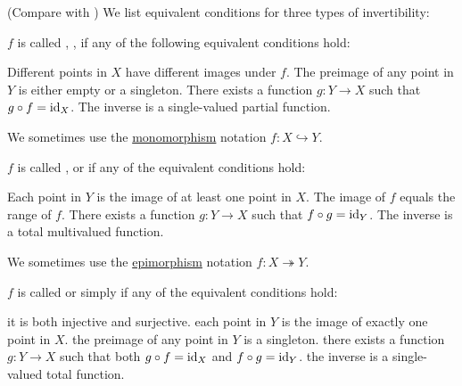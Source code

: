 \begin{definition}\label{def:function_invertibility}(Compare with )
  We list equivalent conditions for three types of invertibility:
  \begin{defenum}
     \( f \) is called , ,  if any of the following equivalent conditions hold:
    \begin{defenum}
       Different points in \( X \) have different images under \( f \).
       The preimage of any point in \( Y \) is either empty or a singleton.
       There exists a function \( g: Y \to X \) such that \( g \circ f = \operatorname{id}_X \).
       The inverse is a single-valued partial function.
    \end{defenum}

    We sometimes use the \hyperref[def:morphism_invertibility/monomorphism]{monomorphism} notation \( f: X \hookrightarrow Y \).

     \( f \) is called ,  or  if any of the equivalent conditions hold:
    \begin{defenum}
       Each point in \( Y \) is the image of at least one point in \( X \).
       The image of \( f \) equals the range of \( f \).
       There exists a function \( g: Y \to X \) such that \( f \circ g = \operatorname{id}_Y \).
       The inverse is a total multivalued function.
    \end{defenum}

    We sometimes use the \hyperref[def:morphism_invertibility/epimorphism]{epimorphism} notation \( f: X \twoheadrightarrow Y \).

     \( f \) is called  or simply  if any of the equivalent conditions hold:
    \begin{defenum}
       it is both injective and surjective.
       each point in \( Y \) is the image of exactly one point in \( X \).
       the preimage of any point in \( Y \) is a singleton.
       there exists a function \( g: Y \to X \) such that both \( g \circ f = \operatorname{id}_X \) and \( f \circ g = \operatorname{id}_Y \).
       the inverse is a single-valued total function.
    \end{defenum}


\end{defenum}
\end{definition}

